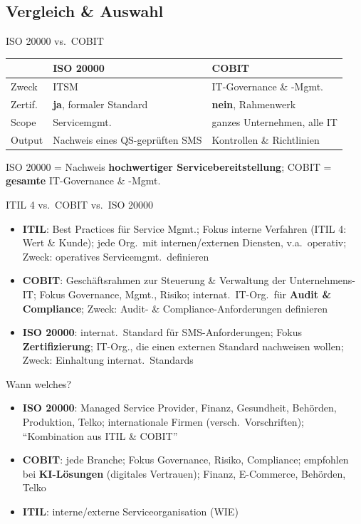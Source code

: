 \documentclass[a4paper, fontsize=7pt]{scrartcl}
\renewcommand*{\arraystretch}{1.5}  %
\begin{document}
\subsection{Vergleich \& Auswahl}

\begin{mainbox}{ISO 20000 vs.\ COBIT}
\renewcommand*{\arraystretch}{1.15}
\begin{tabularx}{\linewidth}{@{}l|>{\raggedright\arraybackslash}X|>{\raggedright\arraybackslash}X@{}}
 & \textbf{ISO 20000} & \textbf{COBIT} \\
\hline
Zweck & ITSM & IT-Governance \& -Mgmt. \\
Zertif. & \textbf{ja}, formaler Standard & \textbf{nein}, Rahmenwerk \\
Scope & Servicemgmt.\ & ganzes Unternehmen, alle IT \\
Output & Nachweis eines QS-geprüften SMS & Kontrollen \& Richtlinien \\
\end{tabularx}
ISO 20000 = Nachweis \textbf{hochwertiger Servicebereitstellung}; COBIT =
\textbf{gesamte} IT-Governance \& -Mgmt.
\end{mainbox}

\begin{mainbox}{ITIL 4 vs.\ COBIT vs.\ ISO 20000}
\begin{itemize}
    \item \textbf{ITIL}: Best Practices für Service Mgmt.; Fokus interne
          Verfahren (ITIL 4: Wert \& Kunde); jede Org.\ mit
          internen/externen Diensten, v.a.\ operativ; Zweck: operatives
          Servicemgmt.\ definieren
    \item \textbf{COBIT}: Geschäftsrahmen zur Steuerung \& Verwaltung der
          Unternehmens-IT; Fokus Governance, Mgmt., Risiko; internat.\
          IT-Org.\ für \textbf{Audit \& Compliance}; Zweck: Audit- \&
          Compliance-Anforderungen definieren
    \item \textbf{ISO 20000}: internat.\ Standard für SMS-Anforderungen;
          Fokus \textbf{Zertifizierung}; IT-Org., die einen externen
          Standard nachweisen wollen; Zweck: Einhaltung internat.\
          Standards
\end{itemize}
\end{mainbox}

\begin{mainbox}{Wann welches?}
\begin{itemize}
    \item \textbf{ISO 20000}: Managed Service Provider, Finanz, Gesundheit,
          Behörden, Produktion, Telko; internationale Firmen (versch.\
          Vorschriften); ``Kombination aus ITIL \& COBIT''
    \item \textbf{COBIT}: jede Branche; Fokus Governance, Risiko,
          Compliance; empfohlen bei \textbf{KI-Lösungen} (digitales
          Vertrauen); Finanz, E-Commerce, Behörden, Telko
    \item \textbf{ITIL}: interne/externe Serviceorganisation (WIE)
\end{itemize}
\end{mainbox}
\end{document}
